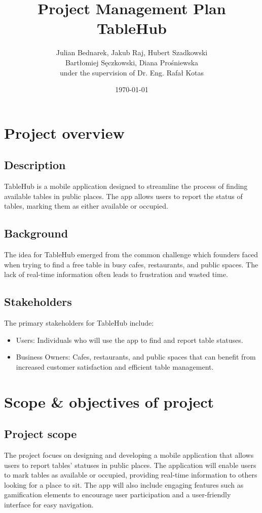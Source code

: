 \documentclass[12pt]{article}
\title{Project Management Plan \\ \vspace{0.25cm} \large TableHub}
\author{Julian Bednarek, Jakub Raj, Hubert Szadkowski \\ Bartłomiej Sęczkowski, Diana Prośniewska \\ under the supervision of Dr. Eng. Rafał Kotas}
\date{\monthyeardate\today}
\begin{document}
\maketitle
\thispagestyle{empty}
\newpage

\tableofcontents
\newpage
\section{Project overview}
\subsection*{Description}
TableHub is a mobile application designed to streamline the process of finding available tables in public places. The app allows users to report the status of tables, marking them as either available or occupied.
\subsection*{Background}
The idea for TableHub emerged from the common challenge which founders faced when trying to find a free table in busy cafes, restaurants, and public spaces. The lack of real-time information often leads to frustration and wasted time. 
\subsection*{Stakeholders}
The primary stakeholders for TableHub include:
\begin{itemize}
    \item Users: Individuals who will use the app to find and report table statuses.
    \item Business Owners: Cafes, restaurants, and public spaces that can benefit from increased customer satisfaction and efficient table management.
\end{itemize}
\section{Scope \& objectives of project}
\subsection*{Project scope}
The project focues on designing and developing a mobile application that allows users to report tables' statuses in public places. The application will enable users to mark tables as available or occupied, providing real-time information to others looking for a place to sit. The app will also include engaging features such as gamification elements to encourage user participation and a user-friendly interface for easy navigation. 
\end{document}
